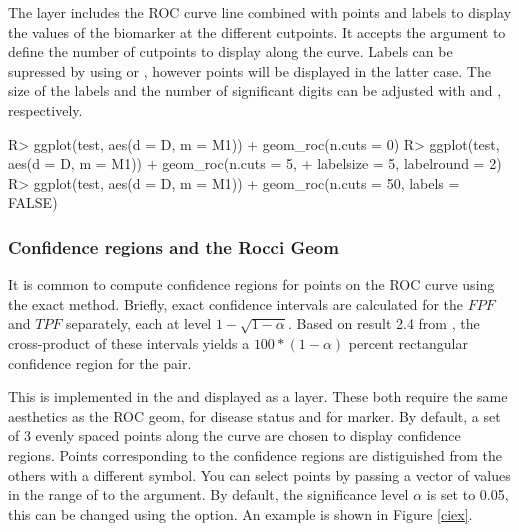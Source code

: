 \documentclass[codesnippet]{jss}
\begin{document}
The  layer includes the ROC curve line combined with
points and labels to display the values of the biomarker at the
different cutpoints. It accepts the argument  to define the
number of cutpoints to display along the curve. Labels can be supressed
by using  or , however points will
be displayed in the latter case. The size of the labels and the number
of significant digits can be adjusted with  and
, respectively.

\begin{Schunk}
\begin{Sinput}
R> ggplot(test, aes(d = D, m = M1)) + geom_roc(n.cuts = 0)
R> ggplot(test, aes(d = D, m = M1)) + geom_roc(n.cuts = 5, 
+                                             labelsize = 5, labelround = 2)
R> ggplot(test, aes(d = D, m = M1)) + geom_roc(n.cuts = 50, labels = FALSE)
\end{Sinput}
\end{Schunk}

\subsubsection{Confidence regions and the Rocci
Geom}\label{confidence-regions-and-the-rocci-geom}

It is common to compute confidence regions for points on the ROC curve
using the \citet{clopper1934use} exact method. Briefly, exact confidence
intervals are calculated for the \(FPF\) and \(TPF\) separately, each at
level \(1 - \sqrt{1 - \alpha}\). Based on result 2.4 from
\citet{pepe2003statistical}, the cross-product of these intervals yields
a \(100 * (1 - \alpha)\) percent rectangular confidence region for the
pair.

This is implemented in the  and displayed as a
 layer. These both require the same aesthetics as the
ROC geom,  for disease status and  for marker. By
default, a set of 3 evenly spaced points along the curve are chosen to
display confidence regions. Points corresponding to the confidence
regions are distiguished from the others with a different symbol. You
can select points by passing a vector of values in the range of 
to the  argument. By default, the significance level
\(\alpha\) is set to 0.05, this can be changed using the
 option. An example is shown in Figure \ref{ciex}.
\end{document}
